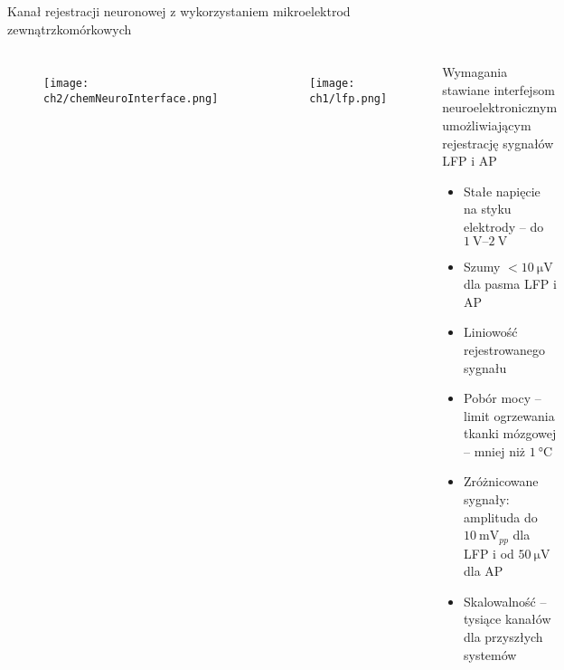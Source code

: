 \begin{frame}{Kanał rejestracji neuronowej z wykorzystaniem mikroelektrod zewnątrzkomórkowych}
\vspace{-1em}
    \begin{columns}
        \begin{figure}[H]
            \centering
            \texttt{[image: ch2/chemNeuroInterface.png]} 

        \end{figure}
        \begin{figure}[H]
            \centering
            \texttt{[image: ch1/lfp.png]} 

          \end{figure}

        \begin{block}{Wymagania stawiane interfejsom neuroelektronicznym umożliwiającym rejestrację sygnałów LFP i AP}
            \begin{itemize}
                \item Stałe napięcie na styku elektrody -- do $\SIrange{1}{2}{\volt}$ 
                \item Szumy $<\SI{10}{\micro\volt}$ dla pasma LFP i AP
                \item Liniowość rejestrowanego sygnału
                \item Pobór mocy -- limit ogrzewania tkanki mózgowej --  mniej niż  $\SI{1}{\degreeCelsius}$ 
                \item Zróżnicowane sygnały: amplituda do $\SI{10}{\milli\volt_{pp}}$ dla LFP i od  $\SI{50}{\micro\volt}$ dla AP
                \item Skalowalność -- tysiące kanałów dla przyszłych systemów
            \end{itemize}
        \end{block}
 
    \end{columns}
\end{frame}



